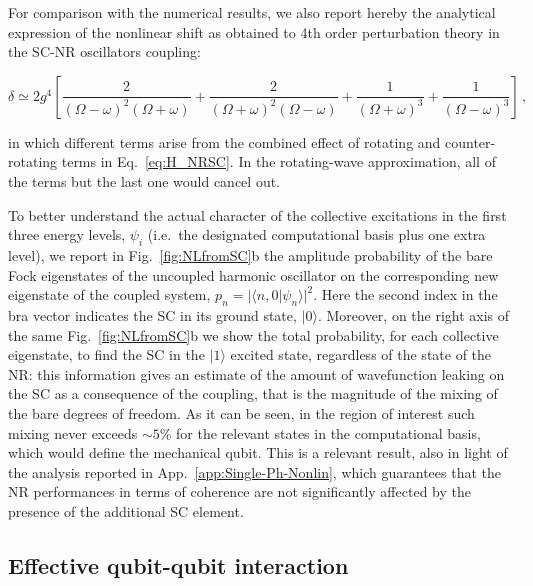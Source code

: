 \documentclass[aps,twocolumn,groupedaddress,superscriptaddress,floatfix,amsmath,amssymb,prb]{revtex4-1}
\begin{document}
For comparison with the numerical results, we also report hereby the analytical expression of the nonlinear shift as obtained to 4th order perturbation theory in the SC-NR oscillators coupling:
\begin{widetext}
\begin{equation}
\delta \simeq 2g^4 \left[\frac{2}{(\Omega-\omega)^2 (\Omega + \omega)} + \frac{2}{(\Omega+\omega)^2 (\Omega - \omega)} + \frac{1}{(\Omega+\omega)^3} + \frac{1}{(\Omega-\omega)^3} \right] \, ,
\label{eq:delta_analytic}
\end{equation}
\end{widetext}
in which different terms arise from the combined effect of rotating and counter-rotating terms in Eq.~\eqref{eq:H_NRSC}. In the rotating-wave approximation, all of the terms but the last one would cancel out.

To better understand the actual character of the collective excitations in the first three energy levels, $\psi_i$ (i.e.\ the designated computational basis plus one extra level), we report in Fig.~\ref{fig:NLfromSC}b the amplitude probability of the bare Fock eigenstates of the uncoupled harmonic oscillator on the corresponding new eigenstate of the coupled system, $p_n = |\langle n,0 |\psi_n\rangle|^2$. Here the second index in the bra vector indicates the SC in its ground state, $|0\rangle$. Moreover, on the right axis of the same Fig.~\ref{fig:NLfromSC}b we show the total probability, for each collective eigenstate, to find the SC in the $|1\rangle$ excited state, regardless of the state of the NR: this information gives an estimate of the amount of wavefunction leaking on the SC as a consequence of the coupling, that is the magnitude of the mixing of the bare degrees of freedom. As it can be seen, in the region of interest such mixing never exceeds $\sim 5\%$ for the relevant states in the computational basis, which would define the mechanical qubit. This is a relevant result, also in light of the analysis reported in App.~\ref{app:Single-Ph-Nonlin}, which guarantees that the NR performances  in terms of coherence are not significantly affected by the presence of the additional SC element. 


\subsection{Effective qubit-qubit interaction}
\end{document}
